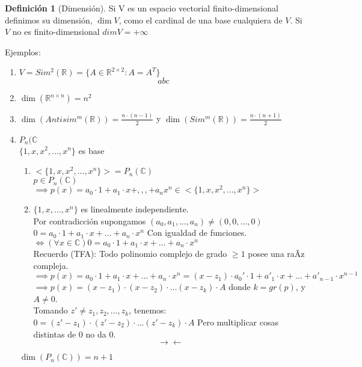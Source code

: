 \documentclass[11pt]{book}
\theoremstyle{definition}
\newtheorem{defn}{Definición}[section]
\begin{document}
\begin{defn}[Dimensión]
Si V es un espacio vectorial finito-dimensional definimos su dimensión, $\dim V$, como el cardinal de una base cualquiera de $V$. Si $V$ no es finito-dimensional $dimV=+\infty$
\end{defn}
Ejemplos:
\begin{enumerate}
	\item $V=Sim^2(\mathbb{R})=\{A\in\mathbb{R}^{2\times 2}:A=A^T\}$
	\[
	abc
	\]
	
	\item $\dim(\mathbb{R}^{n\times n})=n^2$
	
	\item $\dim(Antisim^m(\mathbb{R}))=\frac{n\cdot(n-1)}{2}$ y $\dim(Sim^m(\mathbb{R}))=\frac{n\cdot (n+1)}{2}$
	
	\item$P_n(\mathbb{C}$\\
	$\{1,x,x^2,...,x^n\}$ es base
	\begin{enumerate}
		\item $<\{1,x,x^2,...,x^n\}>=P_n(\mathbb{C})$\\
		$p\in P_n(\mathbb{C})$\\
		$\implies p(x)=a_0\cdot 1+a_1\cdot x+,,,+a_nx^n\in<\{1,x,x^2,...,x^n\}>$
		
		\item $\{1,x,...,x^n\}$ es linealmente independiente.\\
		Por contradicción supongamos $(a_0,a_1,...,a_n)\neq (0,0,...,0)$\\
		$0=a_0\cdot 1+a_1\cdot x+...+a_n\cdot x^n$ Con igualdad de funciones.\\
		$\iff (\forall x\in \mathbb{C}) 0=a_0\cdot 1+a_1\cdot x+...+a_n\cdot x^n$\\
		Recuerdo (TFA): Todo polinomio complejo de grado $\geq 1$ posee una raÃ­z compleja.\\
		$\implies p(x)=a_0\cdot 1+a_1\cdot x+...+a_n\cdot x^n=(x-z_1)\cdot a_0'\cdot 1+a'_1\cdot x+...+a'_{n-1}\cdot x^{n-1}$\\
		$\implies p(x)=(x-z_1)\cdot (x-z_2)\cdot...(x-z_k)\cdot A$ donde $k=gr(p)$, y $A\neq 0$.\\
		Tomando $z'\neq z_1,z_2,...,z_k$, tenemos: $0=(z'-z_1)\cdot (z'-z_2)\cdot...(z'-z_k)\cdot A$ Pero multiplicar cosas distintas de $0$ no da $0$.
		\[
		\rightarrow\leftarrow
		\]
	\end{enumerate}
	$\dim(P_n(\mathbb{C}))=n+1$
\end{enumerate}
\end{document}
